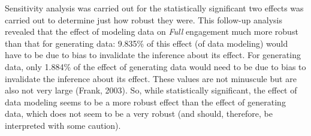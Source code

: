 \documentclass[]{msu-thesis}
\theoremstyle{definition}
\theoremstyle{definition}
\theoremstyle{definition}
\theoremstyle{remark}
\begin{document}
Sensitivity analysis was carried out for the statistically significant
two effects was carried out to determine just how robust they were. This
follow-up analysis revealed that the effect of modeling data on
\emph{Full} engagement much more robust than that for generating data:
9.835\% of this effect (of data modeling) would have to be due to bias
to invalidate the inference about its effect. For generating data, only
1.884\% of the effect of generating data would need to be due to bias to
invalidate the inference about its effect. These values are not
minuscule but are also not very large (Frank, 2003). So, while
statistically significant, the effect of data modeling seems to be a
more robust effect than the effect of generating data, which does not
seem to be a very robust (and should, therefore, be interpreted with
some caution).
\end{document}
